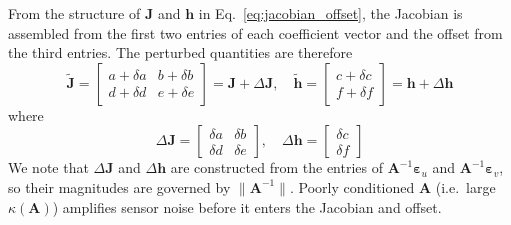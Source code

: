 \documentclass[lettersize,journal]{IEEEtran}
\begin{document}
From the structure of $\mathbf{J}$ and $\mathbf{h}$ in Eq.~\eqref{eq:jacobian_offset}, the Jacobian is assembled from the first two entries of each coefficient vector and the offset from the third entries. The perturbed quantities are therefore
\begin{equation}
    \tilde{\mathbf{J}} = \begin{bmatrix} a+\delta a & b+\delta b \\ d+\delta d & e+\delta e \end{bmatrix} = \mathbf{J} + \Delta\mathbf{J}, \quad
    \tilde{\mathbf{h}} = \begin{bmatrix} c+\delta c \\ f+\delta f \end{bmatrix} = \mathbf{h} + \Delta\mathbf{h}
    \label{eq:perturbed_J_h}
\end{equation}
where
\begin{equation}
    \Delta\mathbf{J} = \begin{bmatrix} \delta a & \delta b \\ \delta d & \delta e \end{bmatrix}, \quad
    \Delta\mathbf{h} = \begin{bmatrix} \delta c \\ \delta f \end{bmatrix}
    \label{eq:Delta_J_h_meas}
\end{equation}
We note that $\Delta\mathbf{J}$ and $\Delta\mathbf{h}$ are constructed from the entries of $\mathbf{A}^{-1}\boldsymbol{\varepsilon}_u$ and $\mathbf{A}^{-1}\boldsymbol{\varepsilon}_v$, so their magnitudes are governed by $\|\mathbf{A}^{-1}\|$. Poorly conditioned $\mathbf{A}$ (i.e.\ large $\kappa(\mathbf{A})$) amplifies sensor noise before it enters the Jacobian and offset.
\end{document}
